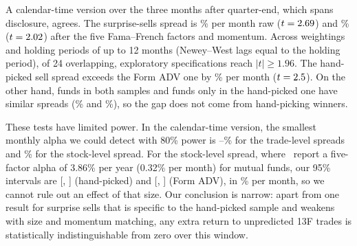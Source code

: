 A calendar-time version over the three months after quarter-end, which spans
disclosure, agrees. The surprise-sells spread is \rawsells\% per month raw
($t = 2.69$) and \ffsells\% ($t = 2.02$) after the five
Fama--French factors and momentum. Across weightings and holding periods of up
to 12 months (Newey--West lags equal to the holding period), \rqthreesig{} of
24 overlapping, exploratory specifications reach $|t| \geq 1.96$. The hand-picked
sell spread exceeds the Form ADV one by \diffsamplesells\% per month ($t =
2.5$). On the other hand, funds in both samples and funds only in the
hand-picked one have similar spreads (\overlapsells\% and
\nonoverlapsells\%), so the gap does not come from hand-picking winners.

These tests have limited power. In the calendar-time version, the smallest
monthly alpha we could detect with 80\% power is \trademdelo--\trademdehi\%
for the trade-level spreads and \stockmdeM\% for the stock-level spread. For
the stock-level spread, where~\cite{cohen2026mimicking} report a five-factor
alpha of 3.86\% per year (0.32\% per month) for mutual funds, our 95\%
intervals are [\stockciloM, \stockcihiM] (hand-picked) and [\stockciloA,
\stockcihiA] (Form ADV), in \% per month, so we cannot rule out an effect of
that size. Our conclusion is narrow: apart from one result for surprise sells
that is specific to the hand-picked sample and weakens with size and momentum
matching, any extra return to unpredicted 13F trades is statistically
indistinguishable from zero over this window.
